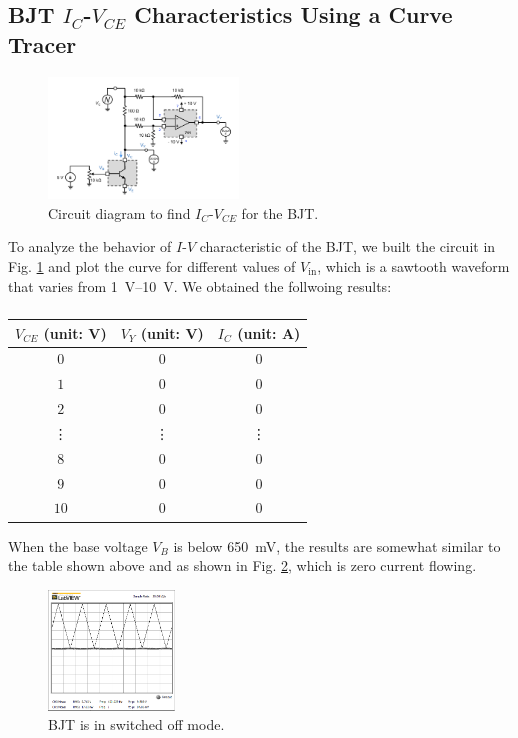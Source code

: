 \documentclass[journal]{IEEEtran}
\begin{document}
\subsection{BJT $I_{C}$-$V_{CE}$ Characteristics Using a Curve Tracer}\label{sec-3}
\begin{figure}[h]
  \centering
  \includegraphics[width=0.45\textwidth]{images/3-1.png}
  \caption{Circuit diagram to find $I_{C}$-$V_{CE}$ for the BJT.}
  \label{fig-8}
\end{figure}
\par To analyze the behavior of $I$-$V$ characteristic of the BJT, we
built the circuit in Fig. \ref{fig-8} and plot the curve for different values
of $V_{\text{in}}$, which is a sawtooth waveform that varies from \SIrange{1}{10}{\volt}.
We obtained the follwoing results:
\subsubsection{}
\begin{center}
    \begin{tabular}{ |c|c|c| }
        \hline
        $V_{CE}$ (unit: \si{\volt}) & $V_{Y}$ (unit: \si{\volt})&  $I_{C}$ (unit: \si{\ampere})\\
        \hline
        $0$ & $0$ & $0$ \\
        \hline
        $1$ & $0$ & $0$ \\
        \hline
        $2$ & $0$ & $0$ \\
        \hline
        \vdots & \vdots & \vdots \\
        \hline
        $8$ & $0$ & $0$ \\
        \hline
        $9$ & $0$ & $0$ \\
        \hline
        $10$ & $0$ & $0$ \\
        \hline
    \end{tabular}
\end{center}
\par When the base voltage $V_{B}$ is below \SI{650}{\mV}, the results are somewhat similar
to the table shown above and as shown in Fig. \ref{fig-3-2}, which is zero current flowing.
\begin{figure}[h]
  \centering
  \includegraphics[width=0.3\textwidth]{images/3-2.png}
  \caption{BJT is in switched off mode.}
  \label{fig-3-2}
\end{figure}
\end{document}
